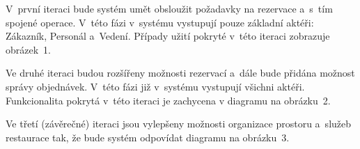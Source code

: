 \documentclass[a4paper,10pt]{article}
\begin{document}
V~první iteraci bude systém umět obsloužit požadavky na rezervace a~s~tím spojené operace. V~této fázi v~systému vystupují pouze základní aktéři: Zákazník, Personál a~Vedení.
Případy užití pokryté v~této iteraci zobrazuje obrázek~1.

Ve druhé iteraci budou rozšířeny možnosti rezervací a~dále bude přidána možnost správy objednávek. V~této fázi již v~systému vystupují všichni aktéři.
Funkcionalita pokrytá v~této iteraci je zachycena v diagramu na obrázku~2.

Ve třetí (závěrečné) iteraci jsou vylepšeny možnosti organizace prostoru a~služeb restaurace tak, že bude systém odpovídat diagramu na obrázku~3.

\begin{center}
\end{center}


\begin{landscape}	
\end{landscape}


\begin{landscape}	
\end{landscape}
\end{document}
